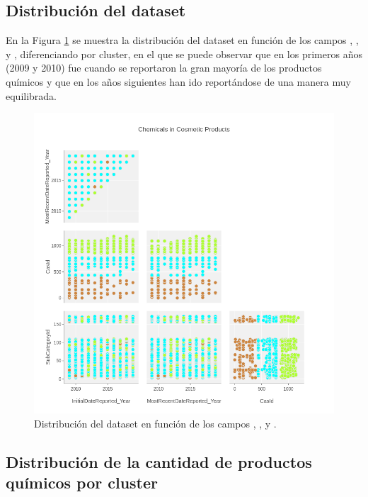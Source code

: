 \newpage
\subsection{Distribución del dataset}
\label{sec:dataset-distribution}

En la Figura \ref{fig:splom-data-aggregated} se muestra la distribución del dataset en función de los campos , ,  y , diferenciando por cluster, en el que se puede observar que en los primeros años (2009 y 2010) fue cuando se reportaron la gran mayoría de los productos químicos y que en los años siguientes han ido reportándose de una manera muy equilibrada.

\begin{figure}[!th]
\includegraphics[scale=0.5]{figures/splom-data-aggregated}
\centering
\caption{Distribución del dataset en función de los campos , ,  y .}
\label{fig:splom-data-aggregated}
\end{figure}




\newpage
\subsection{Distribución de la cantidad de productos químicos por cluster}
\label{sec:chemicals-per-cluster}

